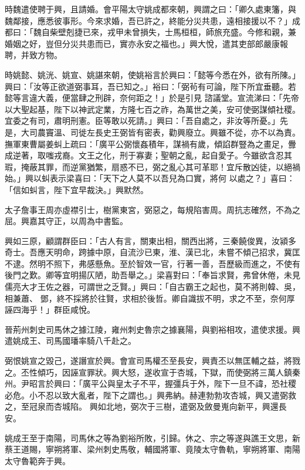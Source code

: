 \begin{pinyinscope}
 時魏遣使聘于興，且請婚。會平陽太守姚成都來朝，興謂之曰：「卿久處東籓，與魏鄰接，應悉彼事形。今來求婚，吾已許之，終能分災共患，遠相接援以不？」成都曰：「魏自柴壁剋捷已來，戎甲未曾損失，士馬桓桓，師旅充盛。今修和親，兼婚姻之好，豈但分災共患而已，實亦永安之福也。」興大悅，遣其吏部郎嚴康報聘，并致方物。



 時姚懿、姚洸、姚宣、姚諶來朝，使姚裕言於興曰：「懿等今悉在外，欲有所陳。」興曰：「汝等正欲道弼事耳，吾已知之。」裕曰：「弼茍有可論，陛下所宜垂聽。若懿等言違大義，便當肆之刑辟，奈何距之！」於是引見
 諮議堂。宣流涕曰：「先帝以大聖起基，陛下以神武定業，方隆七百之祚，為萬世之美，安可使弼謀傾社稷。宜委之有司，肅明刑憲。臣等敢以死請。」興曰：「吾自處之，非汝等所憂。」先是，大司農竇溫、司徙左長史王弼皆有密表，勸興廢立。興雖不從，亦不以為責。撫軍東曹屬姜虯上疏曰：「廣平公弼懷姦積年，謀禍有歲，傾諂群豎為之畫足，釁成逆著，取嗤戎裔。文王之化，刑于寡妻；聖朝之亂，起自愛子。今雖欲含忍其瑕，掩蔽其罪，而逆黨猶繁，扇惑不已，弼之亂心其可革耶！宜斥散凶徒，以絕禍始。」興以虯表示梁喜曰：「天下之人莫不以吾兒為口實，將何
 以處之？」喜曰：「信如虯言，陛下宜早裁決。」興默然。



 太子詹事王周亦虛襟引士，樹黨東宮，弼惡之，每規陷害周。周抗志確然，不為之屈。興嘉其守正，以周為中書監。



 興如三原，顧謂群臣曰：「古人有言，關東出相，關西出將，三秦饒俊異，汝潁多奇士。吾應天明命，跨據中原，自流沙已東，淮、漢已北，未嘗不傾己招求，冀匡不逮。然明不照下，弗感懸魚。至於智效一官，行著一善，吾歷級而進之，不使有後門之歎。卿等宜明揚仄陋，助吾舉之。」梁喜對曰：「奉旨求賢，弗曾休倦，未見儒亮大才王佐之器，可謂世之乏賢。」興曰：「自古霸王之起也，莫不將則韓、吳，相兼蕭、
 鄧，終不採將於往賢，求相於後哲。卿自識拔不明，求之不至，奈何厚誣四海乎！」群臣咸悅。



 晉荊州刺史司馬休之據江陵，雍州刺史魯宗之據襄陽，與劉裕相攻，遣使求援。興遣姚成王、司馬國璠率騎八千赴之。



 弼恨姚宣之毀己，遂譖宣於興。會宣司馬權丕至長安，興責丕以無匡輔之益，將戮之。丕性傾巧，因誣宣罪狀。興大怒，遂收宣于杏城，下獄，而使弼將三萬人鎮秦州。尹昭言於興曰：「廣平公與皇太子不平，握彊兵于外，陛下一旦不諱，恐社稷必危。小不忍以致大亂者，陛下之謂也。」興弗納。赫連勃勃攻杏城，興又遣弼救之，至冠泉而杏城陷。
 興如北地，弼次于三樹，遣弼及斂曼嵬向新平，興還長安。



 姚成王至于南陽，司馬休之等為劉裕所敗，引歸。休之、宗之等遂與譙王文思，新蔡王道賜，寧朔將軍、梁州刺史馬敬，輔國將軍、竟陵太守魯軌，寧朔將軍、南陽太守魯範奔于興。




\end{pinyinscope}
